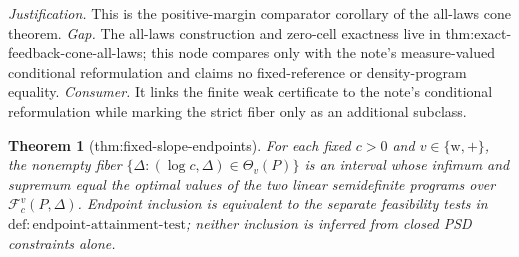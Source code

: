 \documentclass{article}
\newtheorem{theorem}{Theorem}
\begin{document}
\par\smallskip\noindent \textit{Justification.} This is the positive-margin comparator corollary of the all-laws cone theorem. \textit{Gap.} The all-laws construction and zero-cell exactness live in thm:exact-feedback-cone-all-laws; this node compares only with the note's measure-valued conditional reformulation and claims no fixed-reference or density-program equality. \textit{Consumer.} It links the finite weak certificate to the note's conditional reformulation while marking the strict fiber only as an additional subclass.

\begin{theorem}[thm:fixed-slope-endpoints]\label{thm:fixed-slope-endpoints}
For each fixed \(c>0\) and \(v\in\{\mathrm w,+\}\), the nonempty fiber \(\{\Delta:(\log c,\Delta)\in\Theta_v(P)\}\) is an interval whose infimum and supremum equal the optimal values of the two linear semidefinite programs over \(\mathcal F_c^v(P,\Delta)\). Endpoint inclusion is equivalent to the separate feasibility tests in \(\mathrm{def{:}endpoint\text{-}attainment\text{-}test}\); neither inclusion is inferred from closed PSD constraints alone.
\end{theorem}
\end{document}
